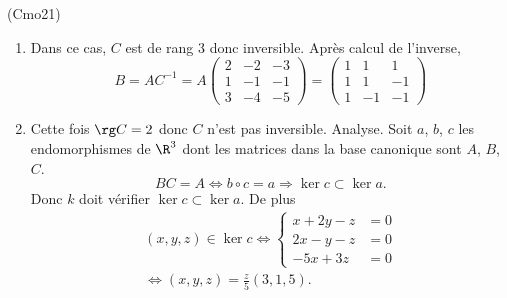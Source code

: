 \begin{tiny}(Cmo21)\end{tiny}
\begin{enumerate}
 \item Dans ce cas, $C$ est de rang $3$ donc inversible. Après calcul de l'inverse, 
\begin{displaymath}
 B=AC^{-1}= A
\begin{pmatrix}
 2 & -2 & -3 \\1 & -1 & -1 \\ 3 & -4 & -5
\end{pmatrix}
=
\begin{pmatrix}
 1 & 1 & 1 \\1 & 1 & -1 \\ 1 & -1 & -1
\end{pmatrix}
\end{displaymath}
\item Cette fois $\rg C = 2$ donc $C$ n'est pas inversible.\newline
Analyse.\newline
Soit $a$, $b$, $c$ les endomorphismes de $\R^3$ dont les matrices dans la base canonique sont $A$, $B$, $C$.
\begin{displaymath}
 BC=A \Leftrightarrow b\circ c = a \Rightarrow \ker c \subset \ker a.
\end{displaymath}
Donc $k$ doit vérifier $\ker c \subset \ker a$. De plus
\begin{multline*}
 (x,y,z)\in \ker c \Leftrightarrow
\left\lbrace  
\begin{aligned}
 x+2y-z&=0\\2x-y-z &=0\\-5x + 3z &=0
\end{aligned}
\right. \\
\Leftrightarrow (x,y,z)=\frac{z}{5}(3,1,5).
\end{multline*}


\end{enumerate}
